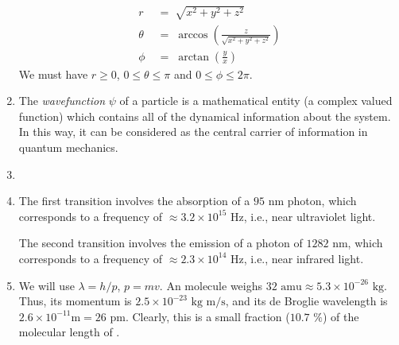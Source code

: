\documentclass[10pt]{article}
\begin{document}
\begin{enumerate}
\begin{center}
                        \end{center}
                        \begin{align*}
                                r \;&=\; \sqrt{x^2 + y^2 + z^2} \\
                                \theta \;&=\; \arccos\left( \frac{z}{\sqrt{x^2 + y^2 + z^2}}\right) \\
                                \phi \;&=\; \arctan\left(\frac{y}{x}\right)
                        \end{align*}
                        We must have $r \geq 0$, $0\leq\theta\leq\pi$ and $0\leq\phi\leq 2\pi$.
                \item The \textit{wavefunction} $\psi$ of a particle is a mathematical entity (a complex valued function) which contains
                all of the dynamical information about the system. In this way, it can be considered as the central carrier of
                information in quantum mechanics.

                \item 
                \item The first transition involves the absorption of a $95 \text{ nm}$ photon, which corresponds to 
                a frequency of $\approx 3.2 \times 10^{15} \text{ Hz}$, i.e., near ultraviolet light.

                The second transition involves the emission of a photon of $1282 \text{ nm}$, which corresponds to
                a frequency of $\approx 2.3 \times 10^{14} \text{ Hz}$, i.e., near infrared light.
                
                \item We will use $\lambda = h/p$, $p = mv$.
                An  molecule weighs $32 \text{ amu} \approx 5.3 \times 10^{-26} \text{ kg}$. Thus, its momentum is $2.5 \times 10^{-23}
                \text{ kg m/s}$, and its de Broglie wavelength is $2.6 \times 10^{-11} \text{m} = 26 \text{ pm}$. Clearly, this is
                a small fraction ($10.7 \text{ \%}$) of the molecular length of .


\end{enumerate}
\end{document}
